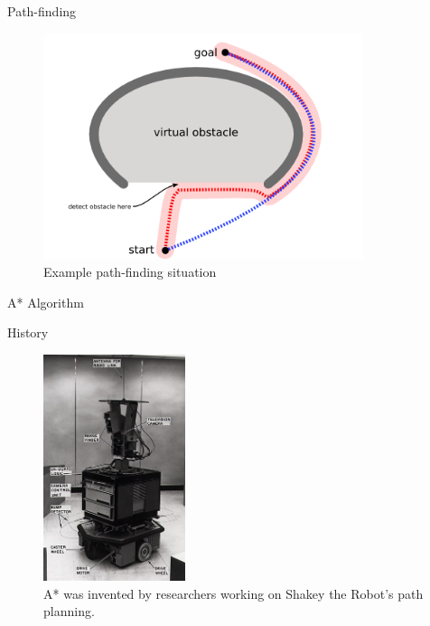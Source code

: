\documentclass[ignorenonframetext,]{beamer}
\begin{document}
\begin{frame}{Path-finding}
\protect\hypertarget{path-finding-1}{}

\begin{figure}
\centering
\includegraphics[width=\textwidth,height=2.60417in]{concave2.png}
\caption{Example path-finding situation}
\end{figure}

\end{frame}

\begin{frame}{A* Algorithm}
\protect\hypertarget{a-algorithm-1}{}

\begin{block}{History}

\begin{figure}
\centering
\includegraphics[width=\textwidth,height=2.60417in]{330px-SRI_Shakey_with_callouts.jpg}
\caption{A* was invented by researchers working on Shakey the Robot's
path planning.}
\end{figure}

\end{block}

\end{frame}
\end{document}
